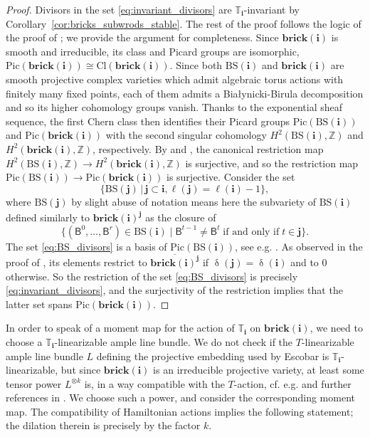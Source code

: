 \documentclass[a4paper, 11pt]{amsart}
\newcommand{\brick}{\mathbf{brick}}
\newcommand{\flag}[1]{\mathsf{B}^{#1}}
\newcommand{\word}[1]{\mathbf{#1}}
\DeclareMathOperator{\dem}{\delta}
\newcommand{\Pic}{\mathrm{Pic}}
\newcommand{\Cl}{\mathrm{Cl}}
\newcommand{\Z}{\mathbb{Z}}
\newcommand{\BS}{\mathrm{BS}}
\newcommand{\dil}[1]{\mathbb{T}_{#1}}
\theoremstyle{definition}
\begin{document}
\begin{proof}
Divisors in the set \eqref{eq:invariant_divisors} are $\dil{\word{i}}$-invariant by Corollary~\ref{cor:bricks_subwrods_stable}. The rest of the proof follows the logic of the proof of \cite[Lemma 5.29]{CGGLSS}; we provide the argument for completeness. Since $\brick(\word{i})$ is smooth and irreducible, its class and Picard groups are isomorphic, $\Pic(\brick(\word{i})) \cong \Cl(\brick(\word{i}))$.
Since both $\BS(\word{i})$ and $\brick(\word{i})$ are
smooth projective complex varieties which admit algebraic torus actions with finitely many fixed points, each of them admits a Białynicki-Birula decomposition and so its higher cohomology groups vanish. Thanks to the exponential sheaf sequence,  the first Chern class then identifies their Picard groups $\Pic(\BS(\word{i}))$ and $\Pic(\brick(\word{i}))$ with the second singular cohomology $H^2(\BS(\word{i}), \Z)$ and $H^2(\brick(\word{i}), \Z)$, respectively. By \cite[Corollary 6.5.(b)]{Haerterich} and \cite[Corollary 6.12]{Shchigolev}, the canonical restriction map $H^2(\BS(\word{i}), \Z) \to H^2(\brick(\word{i}), \Z)$ is surjective, and so the restriction map $\Pic(\BS(\word{i})) \to \Pic(\brick(\word{i}))$ is surjective. Consider the set 
\begin{equation}
\label{eq:BS_divisors}
\{ \BS(\word{j}) \, | \, \word{j} \subset \word{i}, \ell(\word{j}) = \ell(\word{i}) - 1 \}, 
\end{equation}
where $\BS(\word{j})$ by slight abuse of notation means here the subvariety of $\BS(\word{i})$ defined similarly to $\overline{\brick(\word{i})^{\word{j}}}$ as the closure of 
\[
\{(\flag{0}, \dots, \flag{r}) \in \BS(\word{i}) \mid \flag{t-1} \neq \flag{t} \; \text{if and only if} \; t \in \word{j}\}. 
\]
The set \eqref{eq:BS_divisors} is a basis of $\Pic(\BS(\word{i}))$, see e.g. \cite{LFT}. As observed in the proof of \cite[Lemma 5.29]{CGGLSS}, its elements restrict to $\overline{\brick(\word{i})^{\word{j}}}$ if $\dem(\word{j}) = \dem(\word{i})$ and to $0$ otherwise. So the restriction of the set \eqref{eq:BS_divisors} is precisely 
\eqref{eq:invariant_divisors}, and the surjectivity of the restriction implies that the latter set spans $\Pic(\brick(\word{i}))$.
\end{proof}

In order to speak of a moment map for the action of $\dil{\word{i}}$ on $\brick(\word{i})$, we need to choose a $\dil{\word{i}}$-linearizable ample line bundle. We do not check if the $T$-linearizable ample line bundle $L$ defining the projective embedding used by Escobar is  $\dil{\word{i}}$-linearizable, but since $\brick(\word{i})$ is an irreducible projective variety, at least some tensor power $L^{\otimes k}$ is, in a way compatible with the $T$-action, cf. e.g. \cite[Proposition 5.2.4]{Brion_linearization} and further references in \cite{Brion_linearization}. We choose such a power, and consider the corresponding moment map. The compatibility of Hamiltonian actions implies the following  statement; the dilation therein is precisely by the factor $k$. 
\end{document}

